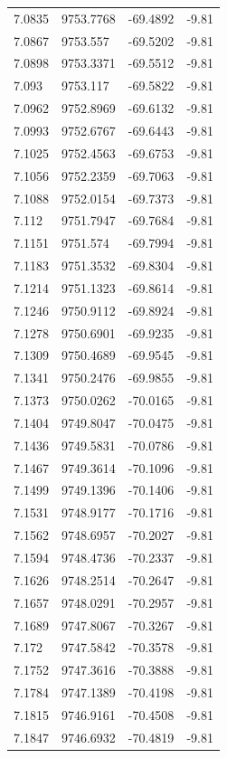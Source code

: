 \begin{table}[H]
\begin{tabular}{llll}
7.0835 & 9753.7768 & -69.4892 & -9.81 \\
7.0867 & 9753.557 & -69.5202 & -9.81 \\
7.0898 & 9753.3371 & -69.5512 & -9.81 \\
7.093 & 9753.117 & -69.5822 & -9.81 \\
7.0962 & 9752.8969 & -69.6132 & -9.81 \\
7.0993 & 9752.6767 & -69.6443 & -9.81 \\
7.1025 & 9752.4563 & -69.6753 & -9.81 \\
7.1056 & 9752.2359 & -69.7063 & -9.81 \\
7.1088 & 9752.0154 & -69.7373 & -9.81 \\
7.112 & 9751.7947 & -69.7684 & -9.81 \\
7.1151 & 9751.574 & -69.7994 & -9.81 \\
7.1183 & 9751.3532 & -69.8304 & -9.81 \\
7.1214 & 9751.1323 & -69.8614 & -9.81 \\
7.1246 & 9750.9112 & -69.8924 & -9.81 \\
7.1278 & 9750.6901 & -69.9235 & -9.81 \\
7.1309 & 9750.4689 & -69.9545 & -9.81 \\
7.1341 & 9750.2476 & -69.9855 & -9.81 \\
7.1373 & 9750.0262 & -70.0165 & -9.81 \\
7.1404 & 9749.8047 & -70.0475 & -9.81 \\
7.1436 & 9749.5831 & -70.0786 & -9.81 \\
7.1467 & 9749.3614 & -70.1096 & -9.81 \\
7.1499 & 9749.1396 & -70.1406 & -9.81 \\
7.1531 & 9748.9177 & -70.1716 & -9.81 \\
7.1562 & 9748.6957 & -70.2027 & -9.81 \\
7.1594 & 9748.4736 & -70.2337 & -9.81 \\
7.1626 & 9748.2514 & -70.2647 & -9.81 \\
7.1657 & 9748.0291 & -70.2957 & -9.81 \\
7.1689 & 9747.8067 & -70.3267 & -9.81 \\
7.172 & 9747.5842 & -70.3578 & -9.81 \\
7.1752 & 9747.3616 & -70.3888 & -9.81 \\
7.1784 & 9747.1389 & -70.4198 & -9.81 \\
7.1815 & 9746.9161 & -70.4508 & -9.81 \\
7.1847 & 9746.6932 & -70.4819 & -9.81 \\

\end{tabular}
\end{table}
